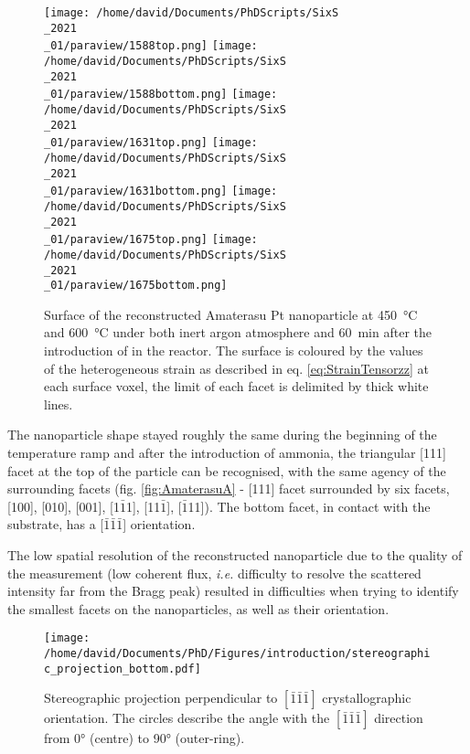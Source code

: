\begin{figure}[!htb]
    \centering
    \texttt{[image: /home/david/Documents/PhDScripts/SixS\\\_2021\\\_01/paraview/1588top.png]}
    \texttt{[image: /home/david/Documents/PhDScripts/SixS\\\_2021\\\_01/paraview/1588bottom.png]}
    \texttt{[image: /home/david/Documents/PhDScripts/SixS\\\_2021\\\_01/paraview/1631top.png]}
    \texttt{[image: /home/david/Documents/PhDScripts/SixS\\\_2021\\\_01/paraview/1631bottom.png]}
    \texttt{[image: /home/david/Documents/PhDScripts/SixS\\\_2021\\\_01/paraview/1675top.png]}
    \texttt{[image: /home/david/Documents/PhDScripts/SixS\\\_2021\\\_01/paraview/1675bottom.png]}
    \caption{
        Surface of the reconstructed Amaterasu Pt nanoparticle at \qty{450}{\degreeCelsius} and \qty{600}{\degreeCelsius} under both inert argon atmosphere and \qty{60}{\minute} after the introduction of \ammonia in the reactor.
        The surface is coloured by the values of the heterogeneous strain as described in eq. \ref{eq:StrainTensorzz} at each surface voxel, the limit of each facet is delimited by thick white lines.
    }
    \label{fig:AmaterasuB}
\end{figure}

The nanoparticle shape stayed roughly the same during the beginning of the temperature ramp and after the introduction of ammonia, the triangular [111] facet at the top of the particle can be recognised, with the same agency of the surrounding facets (fig. \ref{fig:AmaterasuA} - [111] facet surrounded by six facets, [100], [010], [001], [1$\bar{1}$1], [11$\bar{1}$], [$\bar{1}$11]).
The bottom facet, in contact with the substrate, has a [$\bar{1}\bar{1}\bar{1}$] orientation.

The low spatial resolution of the reconstructed nanoparticle due to the quality of the measurement (low coherent flux, \textit{i.e.} difficulty to resolve the scattered intensity far from the Bragg peak) resulted in difficulties when trying to identify the smallest facets on the nanoparticles, as well as their orientation.

\begin{figure}[!htb]
    \centering
    \texttt{[image: /home/david/Documents/PhD/Figures/introduction/stereographic\_projection\_bottom.pdf]}
    \caption{
        Stereographic projection perpendicular to $[\bar{1}\bar{1}\bar{1}]$ crystallographic orientation.
        The circles describe the angle with the $[\bar{1}\bar{1}\bar{1}]$ direction from \ang{0} (centre) to \ang{90} (outer-ring).
    }
    \label{fig:StereoBottom}
\end{figure}

